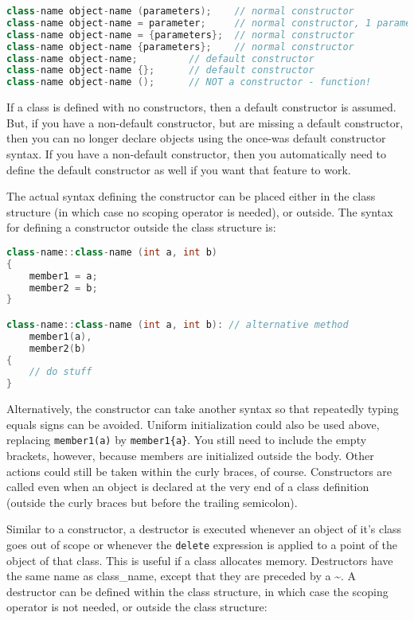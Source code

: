 \documentclass[10pt]{article}
\begin{document}
\begin{lstlisting}[language=C++]
class-name object-name (parameters); 	// normal constructor
class-name object-name = parameter; 	// normal constructor, 1 parameter
class-name object-name = {parameters};  // normal constructor
class-name object-name {parameters};	// normal constructor
class-name object-name;			// default constructor
class-name object-name {};		// default constructor
class-name object-name ();		// NOT a constructor - function!
\end{lstlisting}

If a class is defined with no constructors, then a default constructor is assumed. But, if you have a non-default constructor, but are missing a default constructor, then you can no longer declare objects using the once-was default constructor syntax. If you have a non-default constructor, then you automatically need to define the default constructor as well if you want that feature to work.

The actual syntax defining the constructor can be placed either in the class structure (in which case no scoping operator is needed), or outside. The syntax for defining a constructor outside the class structure is:

\begin{lstlisting}[language=C++]
class-name::class-name (int a, int b)
{
    member1 = a;
    member2 = b;
}

class-name::class-name (int a, int b): // alternative method
    member1(a),
    member2(b)
{
    // do stuff
}
\end{lstlisting}

Alternatively, the constructor can take another syntax so that repeatedly typing equals signs can be avoided. Uniform initialization could also be used above, replacing \texttt{member1(a)} by \texttt{member1\{a\}}. You still need to include the empty brackets, however, because members are initialized outside the body. Other actions could still be taken within the curly braces, of course. Constructors are called even when an object is declared at the very end of a class definition (outside the curly braces but before the trailing semicolon). 

Similar to a constructor, a destructor is executed whenever an object of it's class goes out of scope or whenever the \texttt{delete} expression is applied to a point of the object of that class. This is useful if a class allocates memory. Destructors have the same name as class\_name, except that they are preceded by a \textasciitilde. A destructor can be defined within the class structure, in which case the scoping operator is not needed, or outside the class structure:
\end{document}
